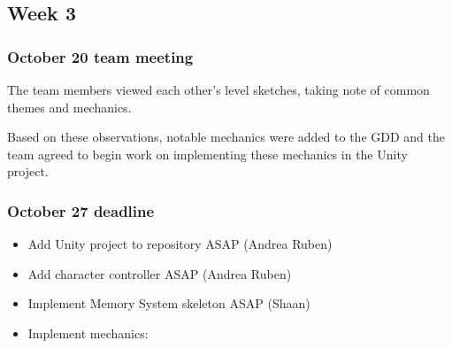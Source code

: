 \subsection{Week 3}

\subsubsection{October 20 team meeting}
The team members viewed each other's level sketches, taking note of common themes and mechanics. \par
Based on these observations, notable mechanics were added to the GDD and the team agreed to begin work on implementing these mechanics in the Unity project.

\subsubsection{October 27 deadline}
\begin{itemize}
    \item Add Unity project to repository ASAP (Andrea Ruben)
    \item Add character controller ASAP (Andrea Ruben)
    \item Implement Memory System skeleton ASAP (Shaan)
    \item Implement mechanics:
\end{itemize}
